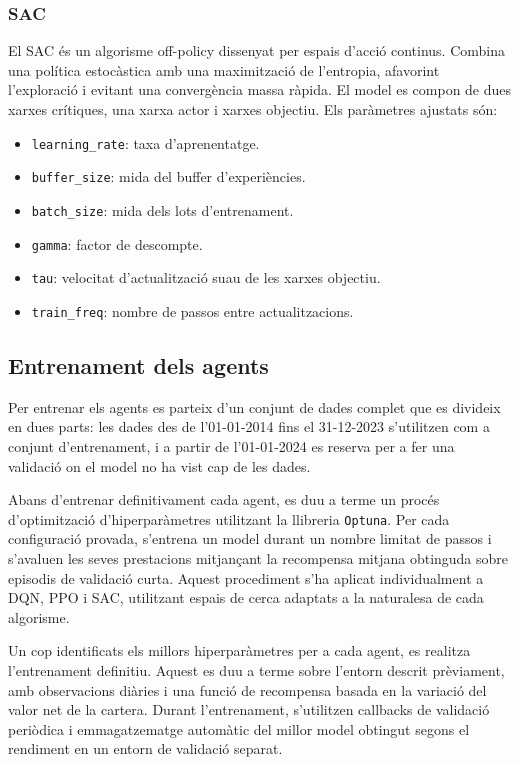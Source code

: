 \documentclass[12pt,a4paper,twoside]{book}
\begin{document}
\subsubsection{SAC}

El SAC és un algorisme off-policy dissenyat per espais d'acció continus. Combina una política estocàstica amb una maximització de l'entropia, afavorint l'exploració i evitant una convergència massa ràpida. El model es compon de dues xarxes crítiques, una xarxa actor i xarxes objectiu. Els paràmetres ajustats són:

\begin{itemize}
    \item \texttt{learning\_rate}: taxa d'aprenentatge.
    \item \texttt{buffer\_size}: mida del buffer d'experiències.
    \item \texttt{batch\_size}: mida dels lots d'entrenament.
    \item \texttt{gamma}: factor de descompte.
    \item \texttt{tau}: velocitat d'actualització suau de les xarxes objectiu.
    \item \texttt{train\_freq}: nombre de passos entre actualitzacions.
\end{itemize}


\subsection{Entrenament dels agents}

Per entrenar els agents es parteix d'un conjunt de dades complet que es divideix en dues parts: les dades des de l'01-01-2014 fins el 31-12-2023 s'utilitzen com a conjunt d'entrenament, i a partir de l'01-01-2024 es reserva per a fer una validació on el model no ha vist cap de les dades.

Abans d'entrenar definitivament cada agent, es duu a terme un procés d'optimització d'hiperparàmetres utilitzant la llibreria \texttt{Optuna}. Per cada configuració provada, s'entrena un model durant un nombre limitat de passos i s'avaluen les seves prestacions mitjançant la recompensa mitjana obtinguda sobre episodis de validació curta. Aquest procediment s'ha aplicat individualment a DQN, PPO i SAC, utilitzant espais de cerca adaptats a la naturalesa de cada algorisme.

Un cop identificats els millors hiperparàmetres per a cada agent, es realitza l'entrenament definitiu. Aquest es duu a terme sobre l'entorn descrit prèviament, amb observacions diàries i una funció de recompensa basada en la variació del valor net de la cartera. Durant l'entrenament, s'utilitzen callbacks de validació periòdica i emmagatzematge automàtic del millor model obtingut segons el rendiment en un entorn de validació separat.
\end{document}
